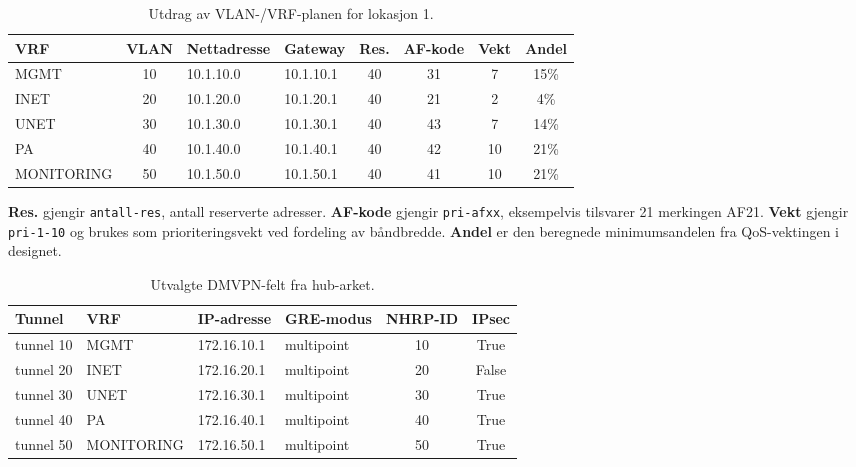 \begin{table}[H]
    \centering
    \caption{Utdrag av VLAN-/VRF-planen for lokasjon 1.}
    \label{tab:excel-vlanplan}
    \small
    \renewcommand{\arraystretch}{1.35}
    \setlength{\tabcolsep}{5pt}
    \begin{tabular}{l c l l c c c c}
        \toprule
        \rowcolor{tablegreen}
        \color{white}\textbf{VRF} &
        \color{white}\textbf{VLAN} &
        \color{white}\textbf{Nettadresse} &
        \color{white}\textbf{Gateway} &
        \color{white}\textbf{Res.} &
        \color{white}\textbf{AF-kode} &
        \color{white}\textbf{Vekt} &
        \color{white}\textbf{Andel} \\
        \midrule
        MGMT & 10 & 10.1.10.0 & 10.1.10.1 & 40 & 31 & 7 & 15\% \\
        INET & 20 & 10.1.20.0 & 10.1.20.1 & 40 & 21 & 2 & 4\% \\
        UNET & 30 & 10.1.30.0 & 10.1.30.1 & 40 & 43 & 7 & 14\% \\
        PA   & 40 & 10.1.40.0 & 10.1.40.1 & 40 & 42 & 10 & 21\% \\
        MONITORING & 50 & 10.1.50.0 & 10.1.50.1 & 40 & 41 & 10 & 21\% \\
        \bottomrule
    \end{tabular}
\end{table}

\noindent
\textbf{Res.} gjengir \texttt{antall-res}, antall reserverte adresser.
\textbf{AF-kode} gjengir \texttt{pri-afxx}, eksempelvis tilsvarer 21
merkingen AF21. \textbf{Vekt} gjengir \texttt{pri-1-10} og brukes som
prioriteringsvekt ved fordeling av båndbredde. \textbf{Andel} er den
beregnede minimumsandelen fra QoS-vektingen i designet.

\begin{table}[H]
    \centering
    \caption{Utvalgte DMVPN-felt fra hub-arket.}
    \label{tab:excel-dmvpn}
    \small
    \renewcommand{\arraystretch}{1.35}
    \setlength{\tabcolsep}{5pt}
    \begin{tabular}{l l l l c c}
        \toprule
        \rowcolor{tablegreen}
        \color{white}\textbf{Tunnel} &
        \color{white}\textbf{VRF} &
        \color{white}\textbf{IP-adresse} &
        \color{white}\textbf{GRE-modus} &
        \color{white}\textbf{NHRP-ID} &
        \color{white}\textbf{IPsec} \\
        \midrule
        tunnel 10 & MGMT & 172.16.10.1 & multipoint & 10 & True \\
        tunnel 20 & INET & 172.16.20.1 & multipoint & 20 & False \\
        tunnel 30 & UNET & 172.16.30.1 & multipoint & 30 & True \\
        tunnel 40 & PA   & 172.16.40.1 & multipoint & 40 & True \\
        tunnel 50 & MONITORING & 172.16.50.1 & multipoint & 50 & True \\
        \bottomrule
    \end{tabular}
\end{table}

